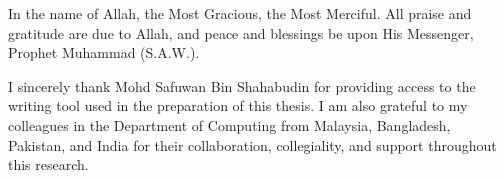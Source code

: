 In the name of Allah, the Most Gracious, the Most Merciful. All praise and gratitude are due to Allah, and peace and blessings be upon His Messenger, Prophet Muhammad (S.A.W.).


I sincerely thank Mohd Safuwan Bin Shahabudin for providing access to the writing tool used in the preparation of this thesis. I am also grateful to my colleagues in the Department of Computing from Malaysia, Bangladesh, Pakistan, and India for their collaboration, collegiality, and support throughout this research.